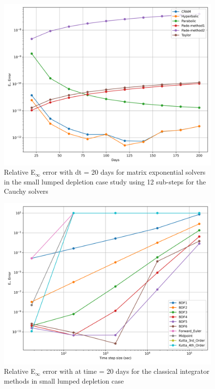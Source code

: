 \clearpage

\begin{figure}[p]
    \centering
    \includegraphics[width=5in]{images/chapter-5/caseStudies/smallLumpedDepletion/msrSmallLumpDepletionEinfErrorerrorSteps12.png}
    \caption{Relative E$_{\infty}$ error with dt = 20 days for matrix exponential solvers in the small lumped depletion case study using 12 sub-steps for the Cauchy solvers}
    \label{fig:small_lumped_depletion_Einf_steps12}
\end{figure}

\clearpage

\begin{figure}[p]
    \centering
    \includegraphics[width=5in]{images/chapter-5/caseStudies/smallLumpedDepletion/msrSmallLumpedDepletionEinfErrorerrorIntegrators.png}
    \caption{Relative E$_{\infty}$ error with at time = 20 days for the classical integrator methods in small lumped depletion case}
    \label{fig:small_lumped_depletion_Einf_integrators}
\end{figure}

